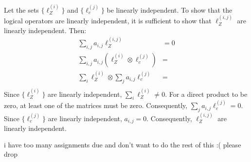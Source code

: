 \documentclass{article}
\begin{document}
Let the sets $\{\ell_Z^{(i)}\}$ and $\{\ell_c^{(j)}\}$ be linearly independent. To show that the logical operators are linearly independent, it is sufficient to show that $\ell_Z^{(i, j)}$ are linearly independent. Then:
\begin{align*}
    \sum_{i,j} a_{i,j}\ell_Z^{(i, j)} & = 0 \\
    \sum_{i,j} a_{i,j}(\ell_Z^{(i)} \otimes \ell_c^{(j)}) & = \\
    \sum_{i} \ell_Z^{(i)} \otimes \sum_j a_{i,j}\ell_c^{(j)} & = \\
\end{align*}
Since $\{\ell_Z^{(i)}\}$ are linearly independent, $\sum_{i} \ell_Z^{(i)} \neq 0$. For a direct product to be zero, at least one of the matrices must be zero. Consequently, $\sum_j a_{i,j}\ell_c^{(j)} = 0$. Since $\{\ell_c^{(j)}\}$ are linearly independent, $a_{i,j} = 0$. Consequently, $\ell_Z^{(i, j)}$ are linearly independent.

i have too many assignments due and don't want to do the rest of this :( please drop


\clearpage

\problem
\end{document}
